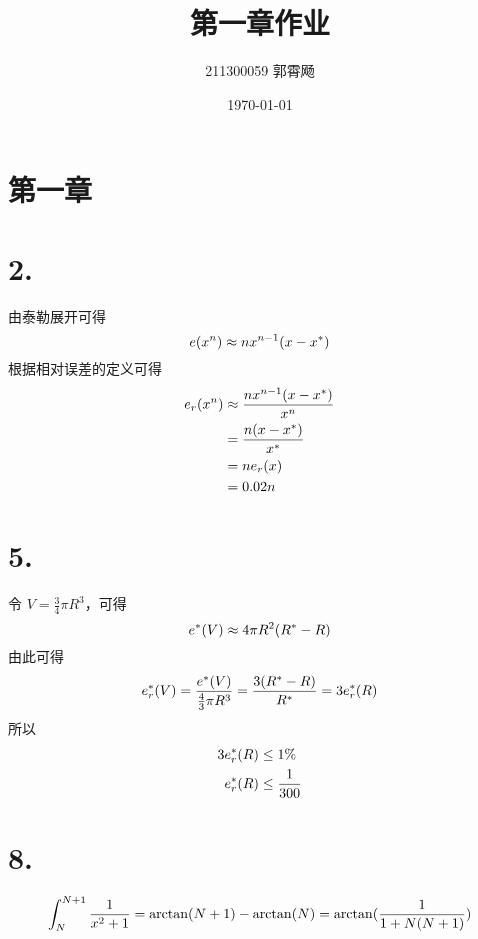 \documentclass[12pt, a4paper, oneside]{ctexart}
\title{第一章作业}
\author{211300059 郭霄飏}
\date{\today}
\begin{document}
\maketitle
\section*{第一章}
\section*{2.}
\noindent 由泰勒展开可得
\begin{equation}
    e(x^n) \approx nx^{n-1}(x-x^*) \notag
\end{equation}
根据相对误差的定义可得
\begin{equation}
    \begin{split}
        e_r(x^n) &\approx \frac{nx^{n-1}(x-x^*)}{x^n} \\
        &= \frac{n(x-x^*)}{x^*} \\
        &= ne_r(x) \\
        &= 0.02n \notag
    \end{split}
\end{equation}


\section*{5.}
\noindent 令 $V = \frac{3}{4} \pi R^3$，可得
\begin{equation}
        e^*(V) \approx 4\pi R^2(R^*-R) \notag
\end{equation}
由此可得
\begin{equation}
    e_r^*(V)=\frac{e^*(V)}{\frac{4}{3}\pi R^3}=\frac{3(R^*-R)}{R^*} = 3e_r^*(R) \notag
\end{equation}
所以
\begin{equation}
    \begin{split}
        3e_r^*(R) &\leq 1\% \\
        e_r^*(R) &\leq \frac{1}{300}
    \end{split}
    \notag
\end{equation}

\section*{8.}
\noindent
\begin{equation}
    \begin{split}
        \int_{N}^{N+1} \frac{1}{x^2+1} = \arctan (N+1) - \arctan(N) = \arctan(\frac{1}{1+N(N+1)}) \notag
    \end{split}
\end{equation}
\end{document}
